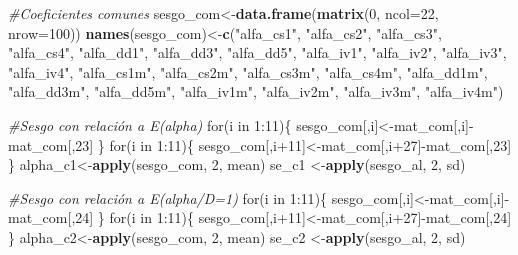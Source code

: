 \documentclass[]{article}
\newenvironment{Shaded}{\begin{snugshade}}{\end{snugshade}}
\newcommand{\KeywordTok}[1]{\textcolor[rgb]{0.13,0.29,0.53}{\textbf{{#1}}}}
\newcommand{\DataTypeTok}[1]{\textcolor[rgb]{0.13,0.29,0.53}{{#1}}}
\newcommand{\DecValTok}[1]{\textcolor[rgb]{0.00,0.00,0.81}{{#1}}}
\newcommand{\StringTok}[1]{\textcolor[rgb]{0.31,0.60,0.02}{{#1}}}
\newcommand{\CommentTok}[1]{\textcolor[rgb]{0.56,0.35,0.01}{\textit{{#1}}}}
\newcommand{\NormalTok}[1]{{#1}}
\begin{document}
\begin{Shaded}
\begin{Highlighting}[]
\CommentTok{#Coeficientes comunes}
\NormalTok{sesgo_com<-}\KeywordTok{data.frame}\NormalTok{(}\KeywordTok{matrix}\NormalTok{(}\DecValTok{0}\NormalTok{, }\DataTypeTok{ncol=}\DecValTok{22}\NormalTok{, }\DataTypeTok{nrow=}\DecValTok{100}\NormalTok{))}
\KeywordTok{names}\NormalTok{(sesgo_com)<-}\KeywordTok{c}\NormalTok{(}\StringTok{"alfa_cs1"}\NormalTok{, }\StringTok{"alfa_cs2"}\NormalTok{, }\StringTok{"alfa_cs3"}\NormalTok{, }\StringTok{"alfa_cs4"}\NormalTok{, }\StringTok{"alfa_dd1"}\NormalTok{,}
                \StringTok{"alfa_dd3"}\NormalTok{, }\StringTok{"alfa_dd5"}\NormalTok{, }\StringTok{"alfa_iv1"}\NormalTok{, }\StringTok{"alfa_iv2"}\NormalTok{, }\StringTok{"alfa_iv3"}\NormalTok{,}
                \StringTok{"alfa_iv4"}\NormalTok{, }\StringTok{"alfa_cs1m"}\NormalTok{, }\StringTok{"alfa_cs2m"}\NormalTok{, }\StringTok{"alfa_cs3m"}\NormalTok{, }\StringTok{"alfa_cs4m"}\NormalTok{,}
                \StringTok{"alfa_dd1m"}\NormalTok{, }\StringTok{"alfa_dd3m"}\NormalTok{, }\StringTok{"alfa_dd5m"}\NormalTok{, }\StringTok{"alfa_iv1m"}\NormalTok{, }\StringTok{"alfa_iv2m"}\NormalTok{,}
                \StringTok{"alfa_iv3m"}\NormalTok{, }\StringTok{"alfa_iv4m"}\NormalTok{)}

\CommentTok{#Sesgo con relación a E(alpha)}
\NormalTok{for(i in }\DecValTok{1}\NormalTok{:}\DecValTok{11}\NormalTok{)\{}
  \NormalTok{sesgo_com[,i]<-mat_com[,i]-mat_com[,}\DecValTok{23}\NormalTok{]}
\NormalTok{\}}
\NormalTok{for(i in }\DecValTok{1}\NormalTok{:}\DecValTok{11}\NormalTok{)\{}
  \NormalTok{sesgo_com[,i}\DecValTok{+11}\NormalTok{]<-mat_com[,i}\DecValTok{+27}\NormalTok{]-mat_com[,}\DecValTok{23}\NormalTok{]}
\NormalTok{\}}
\NormalTok{alpha_c1<-}\KeywordTok{apply}\NormalTok{(sesgo_com, }\DecValTok{2}\NormalTok{, mean)}
\NormalTok{se_c1   <-}\KeywordTok{apply}\NormalTok{(sesgo_al, }\DecValTok{2}\NormalTok{, sd)}

\CommentTok{#Sesgo con relación a E(alpha/D=1)}
\NormalTok{for(i in }\DecValTok{1}\NormalTok{:}\DecValTok{11}\NormalTok{)\{}
  \NormalTok{sesgo_com[,i]<-mat_com[,i]-mat_com[,}\DecValTok{24}\NormalTok{]}
\NormalTok{\}}
\NormalTok{for(i in }\DecValTok{1}\NormalTok{:}\DecValTok{11}\NormalTok{)\{}
  \NormalTok{sesgo_com[,i}\DecValTok{+11}\NormalTok{]<-mat_com[,i}\DecValTok{+27}\NormalTok{]-mat_com[,}\DecValTok{24}\NormalTok{]}
\NormalTok{\}}
\NormalTok{alpha_c2<-}\KeywordTok{apply}\NormalTok{(sesgo_com, }\DecValTok{2}\NormalTok{, mean)}
\NormalTok{se_c2   <-}\KeywordTok{apply}\NormalTok{(sesgo_al, }\DecValTok{2}\NormalTok{, sd)}
\end{Highlighting}
\end{Shaded}
\end{document}
